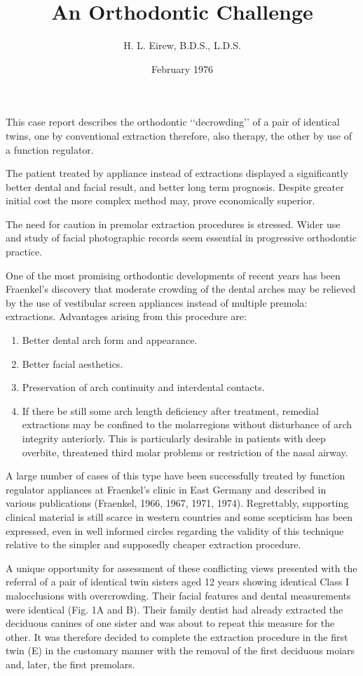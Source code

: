 \documentclass{article}
\title{An Orthodontic Challenge}
\author{H. L. Eirew, B.D.S., L.D.S.}
\date{February 1976}
\begin{document}
\maketitle

This case report describes the orthodontic ‘‘decrowding’’ of a pair of identical twins, one by conventional extraction therefore, also therapy, the other by use of a function regulator.

The patient treated by appliance instead of extractions displayed a significantly better dental and facial result, and better long term prognosis.
Despite greater initial cost the more complex method may, prove economically superior.

The need for caution in premolar extraction procedures is stressed.
Wider use and study of facial photographic records seem essential in progressive orthodontic practice.

One of the most promising orthodontic developments of recent years has been Fraenkel’s discovery that moderate crowding of the dental arches may be relieved by the use of vestibular screen appliances instead of multiple premola: extractions.
Advantages arising from this procedure are:
\begin{enumerate}
\item Better dental arch form and appearance.
\item Better facial aesthetics.
\item Preservation of arch continuity and interdental contacts.
\item If there be still some arch length deficiency after treatment, remedial extractions may be confined to the molarregions without disturbance of arch integrity anteriorly.
This is particularly desirable in patients with deep overbite, threatened third molar problems or restriction of the nasal airway.
\end{enumerate}

A large number of cases of this type have been successfully treated by function regulator appliances at Fraenkel’s clinic in East Germany and described in various publications (Fraenkel, 1966, 1967, 1971, 1974).
Regrettably, supporting clinical material is still scarce in western countries and some scepticism has been expressed, even in well informed circles regarding the validity of this technique relative to the simpler and supposedly cheaper extraction procedure.

A unique opportunity for assessment of these conflicting views presented with the referral of a pair of identical twin sisters aged 12 years showing identical Class I malocclusions with overcrowding.
Their facial features and dental measurements were identical (Fig. 1A and B). Their family dentist had already extracted the deciduous canines of one sister and was about to repeat this measure for the other.
It was therefore decided to complete the extraction procedure in the first twin (E) in the customary manner with the removal of the first deciduous moiars and, later, the first premolars.
\end{document}

